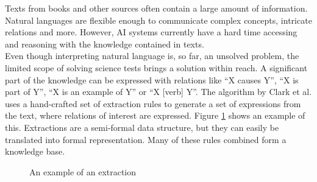 Texts from books and other sources often contain a large amount of information. Natural languages are flexible enough to communicate complex concepts, intricate relations and more. However, AI systems currently have a hard time accessing and reasoning with the knowledge contained in texts.
\\
Even though interpreting natural language is, so far, an unsolved problem, the limited scope of solving science tests brings a solution within reach. A significant part of the knowledge can be expressed with relations like ``X causes Y'', ``X is part of Y'', ``X is an example of Y'' or ``X [verb] Y''. The algorithm by Clark et al. \cite{construction} uses a hand-crafted set of extraction rules to generate a set of expressions from the text, where relations of interest are expressed. Figure \ref{fig:extraction} shows an example of this. Extractions are a semi-formal data structure, but they can easily be translated into formal representation. Many of these rules combined form a knowledge base.

\begin{figure}
\noindent{}
\caption{An example of an extraction}
\label{fig:extraction}
\end{figure}